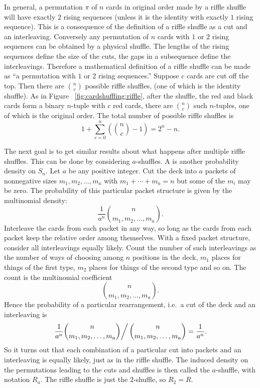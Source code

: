 \documentclass[12pt]{article}
\begin{document}
In general, a permutation \( \pi \) of \( n \) cards in original order
made by a riffle shuffle will have exactly \( 2 \) rising sequences (unless
it is the identity with exactly \( 1 \) rising sequence).  This is a
consequence of the definition of a riffle shuffle as a cut and an
interleaving.  Conversely any permutation of \( n \) cards with \( 1 \)
or \( 2 \) rising sequences can be obtained by a physical shuffle.  The
lengths of the rising sequences define the size of the cuts, the gaps in
a subsequence define the interleavings. Therefore a mathematical
definition of a riffle shuffle can be made as ``a permutation with \( 1 \)
or \( 2 \) rising sequences.'' Suppose \( c \) cards are cut off the
top.  Then there are \( \binom{n}{c} \) possible riffle shuffles, (one
of which is the identity shuffle).  As in Figure~%
\ref{fig:cardshuffling:riffle}, after the shuffle, the red and black
cards form a binary \( n \)-tuple with \( c \) red cards, there are \(
\binom{n}{c} \) such \( n \)-tuples, one of which is the original order.
The total number of possible riffle shuffles is
\[
    1 + \sum\limits_{c=0}^n \left( \binom{n}{c} - 1\right) = 2^n - n.
\]

The next goal is to get similar results about what happens after
multiple riffle shuffles.  This can be done by considering \( a \)-shuffles.
A  is another probability density on \( S_n \).
Let \( a \) be any positive integer.  Cut the deck into \( a \) packets
of nonnegative sizes \( m_1, m_2, \dots, m_a \) with \( m_1 + \cdots + m_a
= n \) but some of the \( m_i \) may be zero.  The probability of this
particular packet structure is given by the multinomial density:
\[
    \frac{1}{a^n} \binom{n}{m_1, m_2, \dots, m_a}.
\] Interleave the cards from each packet in any way, so long as the
cards from each packet keep the relative order among themselves.  With a
fixed packet structure, consider all interleavings equally likely.
Count the number of such interleavings as the number of ways of choosing
among \( n \) positions in the deck, \( m_1 \) places for things of the
first type, \( m_2 \) places for things of the second type and so on.
The count is the multinomial coefficient
\[
    \binom{n}{m_1, m_2, \dots, m_a}.
\] Hence the probability of a particular rearrangement, i.e.\ a cut of
the deck and an interleaving is
\[
    \left.  \frac{1}{a^n} \binom{n}{m_1, m_2, \dots, m_a} \right/ \binom
    {n}{m_1, m_2, \dots, m_a} = \frac{1}{a^n}.
\] So it turns out that each combination of a particular cut into
packets and an interleaving is equally likely, just as in the riffle
shuffle.  The induced density on the permutations leading to the cuts
and shuffles is then called the \( a \)-shuffle,%
with notation \( R_a \).  The riffle shuffle is just the \( 2 \)-shuffle,
so \( R_2 = R \).
\end{document}
